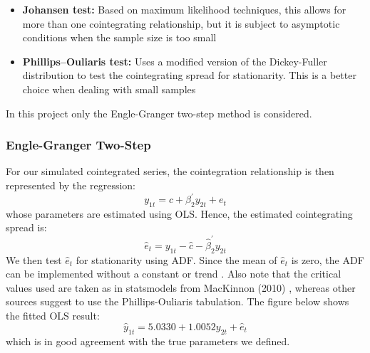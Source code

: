 \documentclass[11pt]{article}
\begin{document}
\begin{itemize}
\item
  \textbf{Johansen test:} Based on maximum likelihood techniques, this
  allows for more than one cointegrating relationship, but it is subject
  to asymptotic conditions when the sample size is too small
\item
  \textbf{Phillips--Ouliaris test:} Uses a modified version of the
  Dickey-Fuller distribution to test the cointegrating spread for
  stationarity. This is a better choice when dealing with small samples
\end{itemize}
In this project only the Engle-Granger two-step method is considered.

    \subsubsection{Engle-Granger Two-Step}\label{engle-granger-test-implementation}

    For our simulated cointegrated series, the cointegration relationship is
then represented by the regression:
\begin{equation}
y_{1t} = c + \beta_2^\prime y_{2t} + e_t
\end{equation}
whose parameters are estimated using OLS. Hence, the estimated
cointegrating spread is:
\begin{equation}
\hat{e}_t = y_{1t} - \hat{c} - \hat{\beta}_2^\prime y_{2t}
\end{equation}
We then test \(\hat{e}_t\) for stationarity using ADF. Since the mean of
\(\hat{e}_t\) is zero, the ADF can be implemented without a constant or
trend \cite{refp445}. Also note that the critical values used are taken as in
statsmodels from MacKinnon (2010) \cite{(seeref)}, whereas other sources suggest to use the Phillips-Ouliaris
tabulation.
The figure below shows the fitted OLS result:
\begin{equation}
\hat{y}_{1t} = 5.0330 + 1.0052 y_{2t} + \hat{e}_t
\end{equation}
which is in good agreement with the true parameters we defined.

    { \hspace*{\fill} \\}
    \begin{center}
    \end{center}
    { \hspace*{\fill} \\}
    
\end{document}
